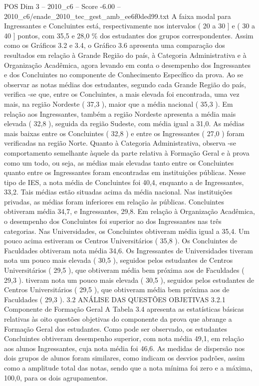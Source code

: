 \begin{textsample}{POS Dim 3 – 2010\_c6 – Score -6.00 – 2010\_c6/enade\_2010\_tec\_gest\_amb\_ee6f0ded99.txt}
A faixa modal para Ingressantes e Concluintes está, respectivamente nos intervalos ( 20 a 30 ] e ( 30 a 40 ] pontos, com 35,5 e 28,0 \% dos estudantes dos grupos correspondentes.
Assim como os Gráficos 3.2 e 3.4, o Gráfico 3.6 apresenta uma comparação dos resultados em relação à Grande Região do país, à Categoria Administrativa e à Organização Acadêmica, agora levando em conta o desempenho dos Ingressantes e dos Concluintes no componente de Conhecimento Específico da prova.
Ao se observar as notas médias dos estudantes, segundo cada Grande Região do país, verifica -se que, entre os Concluintes, a mais elevada foi encontrada, uma vez mais, na região Nordeste ( 37,3 ), maior que a média nacional ( 35,3 ).
Em relação aos Ingressantes, também a região Nordeste apresenta a média mais elevada ( 32,8 ), seguida da região Sudeste, com média igual a 31,0.
As médias mais baixas entre os Concluintes ( 32,8 ) e entre os Ingressantes ( 27,0 ) foram verificadas na região Norte.
Quanto à Categoria Administrativa, observa -se comportamento semelhante àquele da parte relativa à Formação Geral e à prova como um todo, ou seja, as médias mais elevadas tanto entre os Concluintes quanto entre os Ingressantes foram encontradas em instituições públicas.
Nesse tipo de IES, a nota média de Concluintes foi 40,4, enquanto a de Ingressantes, 33,2.
Tais médias estão situadas acima da média nacional.
Nas instituições privadas, as médias foram inferiores em relação às públicas.
Concluintes obtiveram média 34,7, e Ingressantes, 29,8.
Em relação à Organização Acadêmica, o desempenho dos Concluintes foi superior ao dos Ingressantes nas três categorias.
Nas Universidades, os Concluintes obtiveram média igual a 35,4.
Um pouco acima estiveram os Centros Universitários ( 35,8 ).
Os Concluintes de Faculdades obtiveram nota média 34,6.
Os Ingressantes de Universidades tiveram nota um pouco mais elevada ( 30,5 ), seguidos pelos estudantes de Centros Universitários ( 29,5 ), que obtiveram média bem próxima aos de Faculdades ( 29,3 ). tiveram nota um pouco mais elevada ( 30,5 ), seguidos pelos estudantes de Centros Universitários ( 29,5 ), que obtiveram média bem próxima aos de Faculdades ( 29,3 ). 3.2 ANÁLISE DAS QUESTÕES OBJETIVAS 3.2.1 Componente de Formação Geral A Tabela 3.4 apresenta as estatísticas básicas relativas às oito questões objetivas do componente da prova que abrange a Formação Geral dos estudantes.
Como pode ser observado, os estudantes Concluintes obtiveram desempenho superior, com nota média 49,1, em relação aos alunos Ingressantes, cuja nota média foi 46,6.
As medidas de dispersão nos dois grupos de alunos foram similares, como indicam os desvios padrões, assim como a amplitude total das notas, sendo que a nota mínima foi zero e a máxima, 100,0, para os dois agrupamentos.

\end{textsample}
